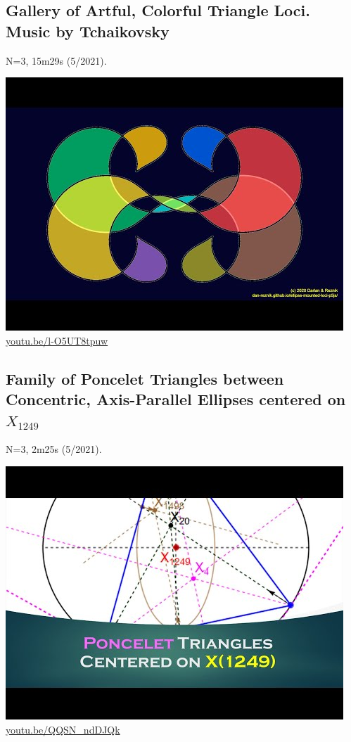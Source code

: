 \documentclass[12pt]{amsart}
\begin{document}
\subsection{Gallery of Artful, Colorful Triangle Loci. Music by Tchaikovsky}
\label{vid:l-O5UT8tpuw}
\noindent N=3, 15m29s (5/2021). 
\begin{center}\includegraphics[width=.5\textwidth]{pics/l-O5UT8tpuw.jpg} \\ 
\href{https://youtu.be/l-O5UT8tpuw}{\url{youtu.be/l-O5UT8tpuw}}\end{center}
% 
\subsection{Family of Poncelet Triangles between Concentric, Axis-Parallel Ellipses centered on $X_{1249}$}
\label{vid:QQSN_ndDJQk}
\noindent N=3, 2m25s (5/2021). 
\begin{center}\includegraphics[width=.5\textwidth]{pics/QQSN_ndDJQk.jpg} \\ 
\href{https://youtu.be/QQSN_ndDJQk}{\url{youtu.be/QQSN\_ndDJQk}}\end{center}
% 
\end{document}
